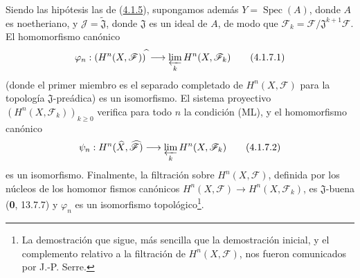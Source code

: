 \begin{corollary}[4.1.7]
\label{III.4.1.7-fr}
Siendo las hipótesis las de \textup{(\hyperref[III.4.1.5-fr]{4.1.5})}, supongamos
además $Y=\operatorname{Spec}(A)$, donde $A$ es noetheriano, y
$\mathcal J=\widetilde{\mathfrak J}$, donde $\mathfrak J$ es un ideal de
$A$, de modo que
$\mathcal F_k=\mathcal F/\mathfrak J^{k+1}\mathcal F$.
El homomorfismo canónico
\[
\varphi_n:(H^n(X,\mathcal F))^{\widehat{\,}}
\longrightarrow\varprojlim_kH^n(X,\mathcal F_k)
\tag{4.1.7.1}\label{III.4.1.7.1-fr}
\]
(donde el primer miembro es el separado completado de $H^n(X,\mathcal F)$ para
la topología $\mathfrak J$-preádica) es un isomorfismo. El sistema
proyectivo $(H^n(X,\mathcal F_k))_{k\geq0}$ verifica para todo $n$ la
condición \textup{(ML)}, y el homomorfismo canónico
\[
\psi_n:H^n(\widehat X,\widehat{\mathcal F})
\longrightarrow\varprojlim_kH^n(X,\mathcal F_k)
\tag{4.1.7.2}\label{III.4.1.7.2-fr}
\]
es un isomorfismo. Finalmente, la filtración sobre $H^n(X,\mathcal F)$, definida
por los núcleos de los homomor%
fismos canónicos
$H^n(X,\mathcal F)\to H^n(X,\mathcal F_k)$, es $\mathfrak J$-buena
\textup{(\textbf{0}, 13.7.7)} y $\varphi_n$ es un isomorfismo topológico\footnote{La demostración que sigue, más sencilla que la demostración
inicial, y el complemento relativo a la filtración de
$H^n(X,\mathcal F)$, nos fueron comunicados por J.-P. Serre.}.
\end{corollary}

